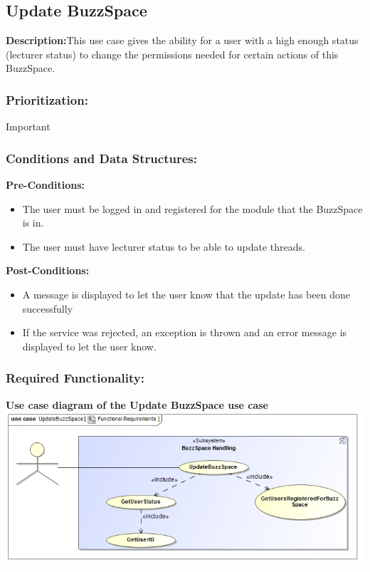 \documentclass[a4paper,11pt]{article}
\begin{document}
\subsection{Update BuzzSpace}
\textbf{Description:}This use case gives the ability for a user with a high enough status (lecturer status) to change the permissions needed for certain actions of this BuzzSpace. 
\subsubsection{Prioritization:} Important
\subsubsection{Conditions and Data Structures:}
\textbf{Pre-Conditions:}
\begin{itemize}
	\item The user must be logged in and registered for the module that the BuzzSpace is in.
	\item The user must have lecturer status to be able to update threads.
\end{itemize}
\textbf{Post-Conditions:}
\begin{itemize}
	\item A message is displayed to let the user know that the update has been done successfully
	\item If the service was rejected, an exception is thrown and an error message is displayed to let the user know.
\end{itemize}
\subsubsection{Required Functionality:} 
\textbf{Use case diagram of the Update BuzzSpace use case}\\
\includegraphics[width=1\linewidth]{./Images/BuzzSpaceHandling/buzzSpaceUpdate.jpg}\\
\end{document}
